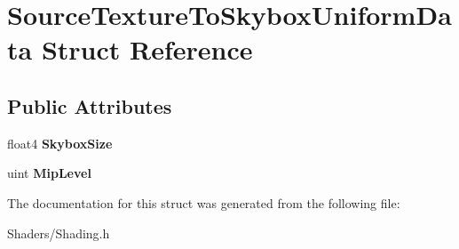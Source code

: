 \hypertarget{structSourceTextureToSkyboxUniformData}{}\section{Source\+Texture\+To\+Skybox\+Uniform\+Data Struct Reference}
\label{structSourceTextureToSkyboxUniformData}
\subsection*{Public Attributes}
\begin{DoxyCompactItemize}
\item 
\mbox{\label{structSourceTextureToSkyboxUniformData_a17ca6e464eba76c5bc0b1d7db285cf63}} 
float4 {\bfseries Skybox\+Size}
\item 
\mbox{\label{structSourceTextureToSkyboxUniformData_a2c9c72316f7c28f13e29adbbd437230a}} 
uint {\bfseries Mip\+Level}
\end{DoxyCompactItemize}


The documentation for this struct was generated from the following file\+:\begin{DoxyCompactItemize}
\item 
Shaders/Shading.\+h\end{DoxyCompactItemize}
